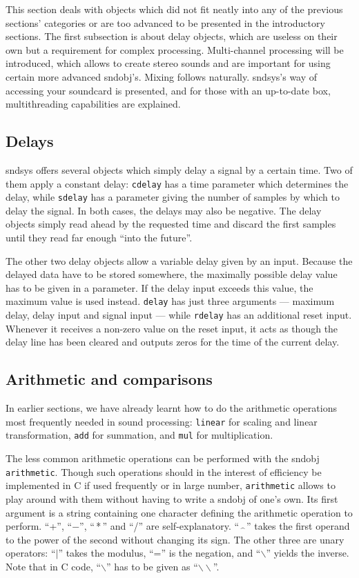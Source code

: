 \documentclass{article}
\def\s{{\sc sndsys} }
\def\sn{{\sc sndsys}}
\begin{document}
This section deals with objects which did not fit neatly into any of the
previous sections' categories or are too advanced to be presented in the
introductory sections.  The first subsection is about delay objects, which are
useless on their own but a requirement for complex processing.  Multi-channel
processing will be introduced, which allows to create stereo sounds and are
important for using certain more advanced sndobj's.  Mixing follows naturally.
\sn's way of accessing your soundcard is presented, and for those with an
up-to-date box, multithreading capabilities are explained.


\subsection{Delays}

\s offers several objects which simply delay a signal by a certain time.  Two
of them apply a constant delay: {\tt cdelay} has a time parameter which
determines the delay, while {\tt sdelay} has a parameter giving the number of
samples by which to delay the signal.  In both cases, the delays may also be
negative.  The delay objects simply read ahead by the requested time and
discard the first samples until they read far enough ``into the future''.

The other two delay objects allow a variable delay given by an input.  Because
the delayed data have to be stored somewhere, the maximally possible delay
value has to be given in a parameter.  If the delay input exceeds this value,
the maximum value is used instead.  {\tt delay} has just three arguments ---
maximum delay, delay input and signal input --- while {\tt rdelay} has an
additional reset input.  Whenever it receives a non-zero value on the reset
input, it acts as though the delay line has been cleared and outputs zeros for
the time of the current delay.


\subsection{Arithmetic and comparisons}
\label{sec:arithmetic}

In earlier sections, we have already learnt how to do the arithmetic operations
most frequently needed in sound processing: {\tt linear} for scaling and linear
transformation, {\tt add} for summation, and {\tt mul} for multiplication.

The less common arithmetic operations can be performed with the sndobj {\tt
arithmetic}.  Though such operations should in the interest of efficiency be
implemented in C if used frequently or in large number, {\tt arithmetic} allows
to play around with them without having to write a sndobj of one's own.  Its
first argument is a string containing one character defining the arithmetic
operation to perform.  ``+'', ``$-$'', ``\,*\,'' and ``/'' are self-explanatory.
``$\,\widehat{\,\;}\,$'' takes the first operand to the power of the second
without changing its sign.  The other three are unary operators: ``$|$'' takes
the modulus, ``='' is the negation, and ``$\backslash$'' yields the inverse.
Note that in C code, ``$\backslash$'' has to be given as
``$\backslash\backslash$''.
\end{document}
